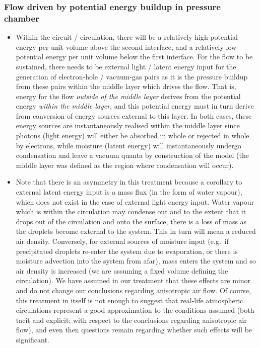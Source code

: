 \subsubsection{Flow driven by potential energy buildup in pressure chamber}

\begin{itemize}
	\item Within the circuit / circulation, there will be a relatively high potential energy per unit volume above the second interface, and a relatively low potential energy per unit volume below the first interface. For the flow to be sustained, there needs to be external light / latent energy input for the generation of electron-hole / vacuum-gas pairs as it is the pressure buildup from these pairs within the middle layer which drives the flow. That is, energy for the flow \textit{outside of the middle layer} derives from the potential energy \textit{within the middle layer}, and this potential energy must in turn derive from conversion of energy sources external to this layer. In both cases, these energy sources are instantaneously realised within the middle layer since photons (light energy) will either be absorbed in whole or rejected in whole by electrons, while moisture (latent energy) will instantaneously undergo condensation and leave a vacuum quanta by construction of the model (the middle layer was defined as the region where condensation will occur). 
	\item Note that there is an asymmetry in this treatment because a corollary to external latent energy input is a mass flux (in the form of water vapour), which does not exist in the case of external light energy input. Water vapour which is within the circulation may condense out and to the extent that it drops out of the circulation and onto the surface, there is a loss of mass as the droplets become external to the system. This in turn will mean a reduced air density. Conversely, for external sources of moisture input (e.g.\ if precipitated droplets re-enter the system due to evaporation, or there is moisture advection into the system from afar), mass enters the system and so air density is increased (we are assuming a fixed volume defining the circulation). We have assumed in our treatment that these effects are minor and do not change our conclusions regarding anisotropic air flow. Of course, this treatment in itself is not enough to suggest that real-life atmospheric circulations represent a good approximation to the conditions assumed (both tacit and explicit; with respect to the conclusions regarding anisotropic air flow), and even then questions remain regarding whether such effects will be significant.
\end{itemize}

